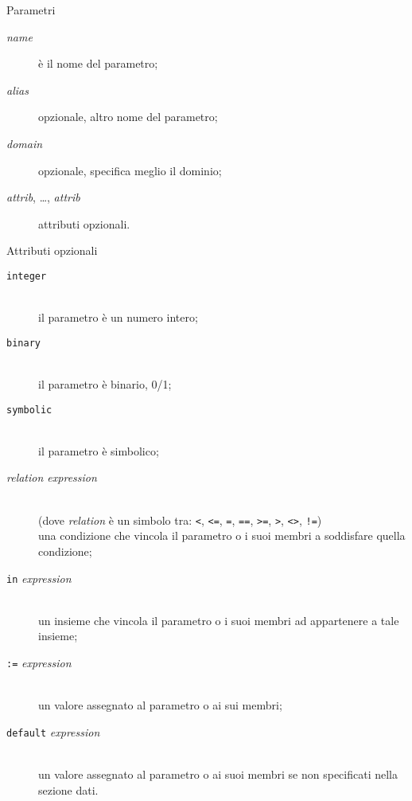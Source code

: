 \documentclass{beamer}
\begin{document}
\begin{frame}{Parametri}


\begin{description}

\item[{\it name}] \`e il nome del parametro;

\item[{\it alias}] opzionale, altro nome del parametro;

\item[{\it domain}] opzionale, specifica meglio il dominio;

\item[{\it attrib}, \dots, {\it attrib}] attributi opzionali.
\end{description}

\framebreak

{\small Attributi opzionali}

\vspace*{-8pt}

{\footnotesize \begin{description}
\item[{\tt integer}]\hspace*{0pt}\\
il parametro \`e un numero intero;
\item[{\tt binary}]\hspace*{0pt}\\
il parametro \`e binario, 0/1;
\item[{\tt symbolic}]\hspace*{0pt}\\
il parametro \`e simbolico;
\item[{\it relation expression}]\hspace*{0pt}\\
(dove {\it relation} \`e un simbolo tra: {\tt<}, {\tt<=}, {\tt=}, {\tt==},
{\tt>=}, {\tt>}, {\tt<>}, {\tt!=})\\
una condizione che vincola il parametro o i suoi membri a soddisfare
quella condizione;
\item[{\tt in} {\it expression}]\hspace*{0pt}\\
un insieme che vincola il parametro o i suoi membri ad appartenere a tale
insieme;
\item[{\tt:=} {\it expression}]\hspace*{0pt}\\
un valore assegnato al parametro o ai sui membri;
\item[{\tt default} {\it expression}]\hspace*{0pt}\\
un valore assegnato al parametro o ai suoi membri se
non specificati nella sezione dati.
\end{description}}


\end{frame}
\end{document}
